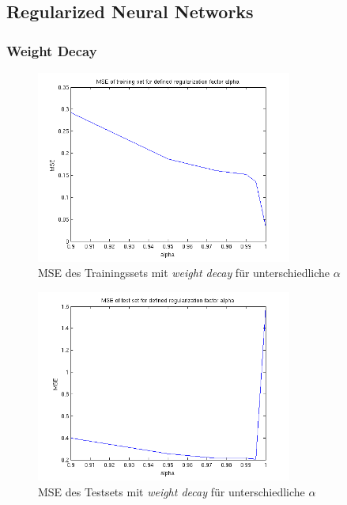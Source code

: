 \subsection{Regularized Neural Networks}

\subsubsection{Weight Decay}

\begin{figure}[h!]
  \centering
  \includegraphics[width=0.75\textwidth]{./figures/3/3_1_mse_train_wd.png}
  \caption{MSE des Trainingssets mit \emph{weight decay} für unterschiedliche $\alpha$}
  \label{fig:3_1_mse_train_wd}
\end{figure}

\begin{figure}[h!]
  \centering
  \includegraphics[width=0.75\textwidth]{./figures/3/3_1_mse_test_wd.png}
  \caption{MSE des Testsets mit \emph{weight decay} für unterschiedliche $\alpha$}
  \label{fig:3_1_mse_test_wd}
\end{figure}

